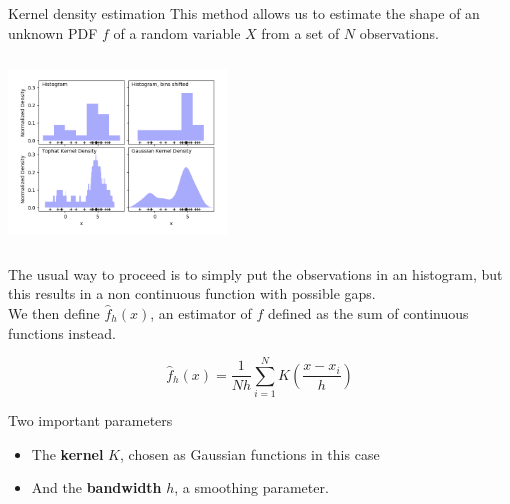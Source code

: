 \documentclass[handout,8 pt]{beamer}
\begin{document}
\begin{frame}{Kernel density estimation}
This method allows us to estimate the shape of an unknown PDF $f$ of a random variable $X$ from a set of $N$ observations.

\begin{minipage}[c]{.50\textwidth}
\includegraphics[width=5.8cm, height=5cm]{figs/kernels.png}
\end{minipage}
\begin{minipage}[c]{.50\textwidth}
\justifying
The usual way to proceed is to simply put the observations in an histogram, but this results in a non continuous function with possible gaps. \\ \vspace{10pt}
We then define $\hat{f}_h(x)$, an estimator of $f$ defined as the sum of continuous functions instead.

\begin{equation*}
\label{eq:KDF}
\hat{f}_h(x) = \frac{1}{Nh} \sum_{i=1}^{N} K \left (\frac{x-x_i}{h} \right )
\end{equation*}
\end{minipage}

Two important parameters
\begin{itemize}
\item The \textbf{\alert{kernel}} $K$, chosen as Gaussian functions in this case
\item And the \textbf{\alert{bandwidth}} $h$, a smoothing parameter.
\end{itemize} \vfill

\end{frame}
\end{document}

